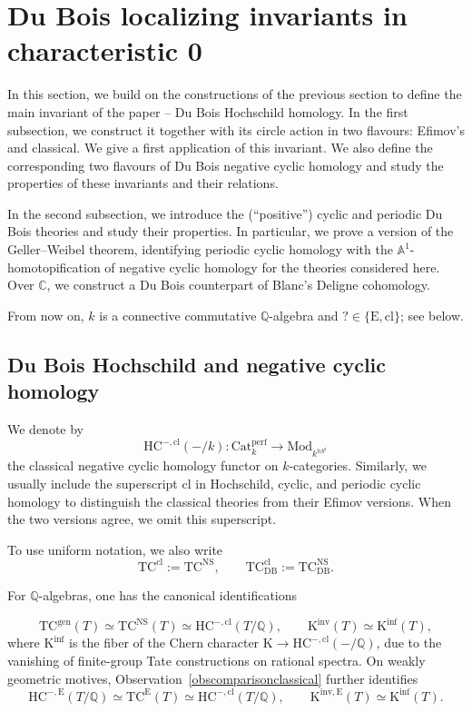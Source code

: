 \documentclass{amsart}
\theoremstyle{plain}
\theoremstyle{definition}
\newcommand{\bbA}{\mathbb{A}}
\newcommand{\bbC}{\mathbb{C}}
\newcommand{\bbQ}{\mathbb{Q}}
\newcommand{\Catperf}{\mathrm{Cat}^{\mathrm{perf}}}
\newcommand{\TC}{\mathrm{TC}}
\newcommand{\HC}{\mathrm{HC}}
\newcommand{\K}{\mathrm{K}}
\newcommand{\Mod}{\mathrm{Mod}}
\newcommand{\DB}{\mathrm{DB}}
\newcommand{\NS}{\mathrm{NS}}
\newcommand{\gen}{\mathrm{gen}}
\newcommand{\cl}{\mathrm{cl}}
\begin{document}
\section{Du Bois localizing invariants in characteristic 0}

In this section, we build on the constructions of the previous section to define the main invariant of the paper -- Du Bois Hochschild homology. In the first subsection, we construct it together with its circle action in two flavours: Efimov's and classical.
We give a first application of this invariant.
We also define the corresponding two flavours of Du Bois negative cyclic homology and study the properties of these invariants and their relations.

In the second subsection, we introduce the
(``positive'') cyclic and periodic Du Bois theories and study their properties. In particular, we prove a version of the Geller--Weibel theorem, identifying periodic cyclic homology with the
$\bbA^1$-homotopification of negative cyclic homology for the theories considered here.
Over $\bbC$, we construct a Du Bois counterpart of Blanc's Deligne cohomology.

\medskip

From now on, $k$ is a connective commutative
$\bbQ$-algebra and $?\in\{\mathrm{E},\cl\}$;
see below.

\subsection{Du Bois Hochschild and negative cyclic homology}

We denote by
\[
\HC^{-,\cl}(-/k):
\Catperf_k\longrightarrow\Mod_{k^{hS^1}}
\]
the classical negative cyclic homology functor on $k$-categories. Similarly, we usually include the superscript $\cl$
in Hochschild, cyclic, and periodic cyclic homology to distinguish the classical theories from their Efimov versions. When the two versions agree, we omit this superscript.

To use uniform notation, we also write
\[
\TC^{\cl}:=\TC^{\NS},
\qquad
\TC^{\cl}_{\DB}:=\TC^{\NS}_{\DB}.
\]














For $\bbQ$-algebras, one has the canonical identifications

\[
\TC^{\gen}(T)\simeq \TC^{\NS}(T)
\simeq \HC^{-, \cl}(T/\bbQ),
\qquad
\K^{\mathrm{inv}}(T)\simeq \K^{\mathrm{inf}}(T),
\]
where $\K^{\mathrm{inf}}$ is the fiber of the Chern character
$\K\to \HC^{-,\cl}(-/\bbQ)$, due to the vanishing of finite-group Tate constructions on rational spectra. On weakly geometric motives, Observation~\ref{obscomparisonclassical}
further identifies
\[
\HC^{-, \mathrm{E}}(T/\bbQ)\simeq\TC^{\mathrm{E}}(T)
\simeq \HC^{-,\cl}(T/\bbQ),
\qquad
\K^{\mathrm{inv},\mathrm{E}}(T)\simeq \K^{\mathrm{inf}}(T).
\]
\end{document}

